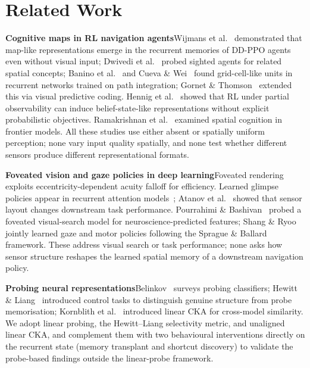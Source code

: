 \documentclass{article}
\begin{document}
\section{Related Work}

\noindent\textbf{Cognitive maps in RL navigation agents}\quad Wijmans et al.~\citep{wijmans2023emergence} demonstrated that map-like representations emerge in the recurrent memories of DD-PPO agents even without visual input; Dwivedi et al.~\citep{dwivedi2022isee} probed sighted agents for related spatial concepts; Banino et al.~\citep{banino2018grid} and Cueva \& Wei~\citep{cueva2018grid} found grid-cell-like units in recurrent networks trained on path integration; Gornet \& Thomson~\citep{gornet2024cognitive} extended this via visual predictive coding. Hennig et al.~\citep{hennig2023belief} showed that RL under partial observability can induce belief-state-like representations without explicit probabilistic objectives. Ramakrishnan et al.~\citep{ramakrishnan2025space} examined spatial cognition in frontier models. All these studies use either absent or spatially uniform perception; none vary input quality spatially, and none test whether different sensors produce different representational formats.

\noindent\textbf{Foveated vision and gaze policies in deep learning}\quad Foveated rendering~\citep{strasburger2011peripheral,rosenholtz2016peripheral} exploits eccentricity-dependent acuity falloff for efficiency. Learned glimpse policies appear in recurrent attention models~\citep{mnih2014attention}; Atanov et al.~\citep{atanov2024photoreceptor} showed that sensor layout changes downstream task performance. Pourrahimi \& Bashivan~\citep{pourrahimi2025foveated} probed a foveated visual-search model for neuroscience-predicted features; Shang \& Ryoo~\citep{shang2023sugarl} jointly learned gaze and motor policies following the Sprague \& Ballard~\citep{sprague2003eyemovements} framework. These address visual search or task performance; none asks how sensor structure reshapes the learned spatial memory of a downstream navigation policy.

\noindent\textbf{Probing neural representations}\quad Belinkov~\citep{belinkov2022probing} surveys probing classifiers; Hewitt \& Liang~\citep{hewitt2019control} introduced control tasks to distinguish genuine structure from probe memorisation; Kornblith et al.~\citep{kornblith2019cka} introduced linear CKA for cross-model similarity. We adopt linear probing, the Hewitt--Liang selectivity metric, and unaligned linear CKA, and complement them with two behavioural interventions directly on the recurrent state (memory transplant and shortcut discovery) to validate the probe-based findings outside the linear-probe framework.
\end{document}
